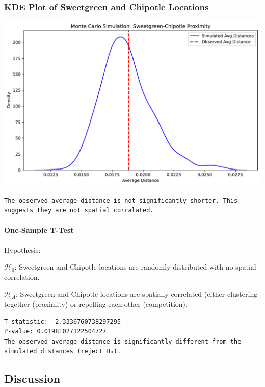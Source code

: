 \documentclass[
  letterpaper,
  DIV=11,
  numbers=noendperiod]{scrartcl}
\let\oldparagraph\paragraph
\renewcommand{\paragraph}[1]{\oldparagraph{#1}\mbox{}}
\begin{document}
\subsubsection{KDE Plot of Sweetgreen and Chipotle
Locations}\label{kde-plot-of-sweetgreen-and-chipotle-locations}

\includegraphics{index_files/figure-pdf/cell-8-output-2.pdf}

\begin{verbatim}
The observed average distance is not significantly shorter. This suggests they are not spatial corralated.
\end{verbatim}

\paragraph{One-Sample T-Test}\label{one-sample-t-test}

Hypothesis:

\(\mathcal{H}_0\): Sweetgreen and Chipotle locations are randomly
distributed with no spatial correlation.

\(\mathcal{H}_A\): Sweetgreen and Chipotle locations are spatially
correlated (either clustering together (proximity) or repelling each
other (competition).

\begin{verbatim}
T-statistic: -2.3336760738297295
P-value: 0.01981027122504727
The observed average distance is significantly different from the simulated distances (reject H₀).
\end{verbatim}

\subsection{Discussion}\label{discussion}
\end{document}
